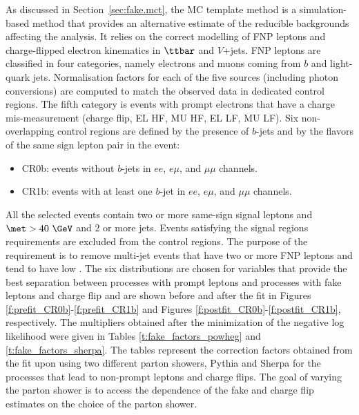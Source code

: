 As discussed in Section~\ref{sec:fake.mct}, the MC template method is
 a simulation-based method that provides an alternative estimate of the reducible backgrounds affecting the analysis.
It relies on the correct modelling of FNP leptons and charge-flipped electron kinematics in $\ttbar$ 
and $V$+jets.
FNP leptons are classified in four categories, namely electrons and muons coming 
from $b$ and light-quark jets. Normalisation factors for each of the five sources (including photon conversions) are computed to match the observed data 
in dedicated control regions. The fifth category is events with prompt electrons that have a charge mis-measurement 
(charge flip, EL HF, MU HF, EL LF, MU LF).
Six non-overlapping control regions are defined by the presence of $b$-jets and by the flavors of the same sign lepton pair in the event:
\begin{itemize}
\item CR0b: events without $b$-jets in $ee$, $e\mu$, and $\mu\mu$ channels.
\item CR1b: events with at least one $b$-jet in $ee$, $e\mu$, and $\mu\mu$ channels.
\end{itemize}
All the selected events contain two or more same-sign signal leptons and \\$\met >40~\GeV$ and 2 or more jets. 
Events satisfying the signal regions requirements are excluded from the control regions. 
The purpose of the \met requirement is to remove multi-jet events that have two or more FNP leptons and tend to have low \met. 
The six distributions are chosen for variables that provide the best separation between processes with prompt leptons and processes with 
fake leptons and charge flip and are shown 
before and after the fit in Figures \ref{f:prefit_CR0b}-\ref{f:prefit_CR1b} and Figures \ref{f:postfit_CR0b}-\ref{f:postfit_CR1b}, 
respectively. 
The multipliers obtained after the minimization of the negative log likelihood were given 
in Tables \ref{t:fake_factors_powheg} and \ref{t:fake_factors_sherpa}.
The tables represent the correction factors obtained from the fit upon using two different parton showers, Pythia and Sherpa
for the processes that lead to non-prompt leptons and charge flips.
The goal of varying the parton shower is to access the dependence of the fake and charge flip estimates on the choice of the 
parton shower. 

